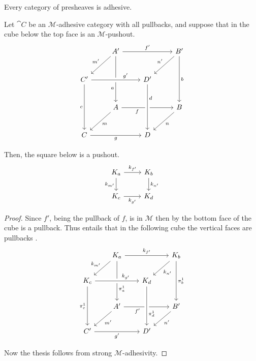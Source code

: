 \begin{cor}\label{cor:presh_adhesive}
    Every category of presheaves is adhesive.
\end{cor}

\color{blue}


\begin{lemma}\label{lemma:pushouts_kernel_pairs}
	Let $\cat C$ be an  $\mathcal{M}$-adhesive category with all pullbacks, and suppose that in the cube below the top face is an $\mathcal{M}$-pushout.
	\[\begin{tikzcd}[row sep=25, column sep=25]
		& {A'} && {B'} \\
		{C'} && {D'} \\
		& A && B \\
		C && D
		\arrow["{f'}", from=1-2, to=1-4]
		\arrow["{m'}"', from=1-2, to=2-1]
		\arrow["a"'{pos=0.7}, from=1-2, to=3-2]
		\arrow["{n'}"', from=1-4, to=2-3]
		\arrow["b", from=1-4, to=3-4]
		\arrow["{g'}"{pos=0.7}, from=2-1, to=2-3, crossing over]
		\arrow["c"', from=2-1, to=4-1]
		\arrow["f"'{pos=0.3}, from=3-2, to=3-4]
		\arrow["d"{pos=0.3}, from=2-3, to=4-3, crossing over]
		\arrow["m", from=3-2, to=4-1]
		\arrow["n", from=3-4, to=4-3]
		\arrow["g"', from=4-1, to=4-3]
	\end{tikzcd}\]
	
	Then, the square below is a pushout.
	\[
	\begin{tikzcd}%
		{K_a} \ar[r, "{k_{f'}}"] \ar[d, "{k_{m'}}"'] & {K_b} \ar[d, "{k_{n'}}"] \\
		{K_c} \ar[r, "{k_{g'}}"'] & {K_d}
	\end{tikzcd}
	\]
\end{lemma}

\begin{proof}
	Since $f'$, being the pullback of $f$, is in $\mathcal{M}$ then by   the bottom face of the cube is a pullback. Thus  entails that in the following cube the vertical faces are pullbacks .
	\[\begin{tikzcd}[row sep = 20, column sep = 20]
		& {K_a} && {K_b} \\
		{K_c} && {K_d} \\
		& {A'} && {B'} \\
		{C'} && {D'}
		\arrow["{k_{f'}}", from=1-2, to=1-4]
		\arrow["{k_{m'}}"', from=1-2, to=2-1]
		\arrow["{\pi_a^1}"{pos=0.7}, from=1-2, to=3-2]
		\arrow["{k_{n'}}", from=1-4, to=2-3]
		\arrow["{\pi_b^1}", from=1-4, to=3-4]
		\arrow["{k_{g'}}"{pos=0.7}, from=2-1, to=2-3, crossing over]
		\arrow["{\pi_c^1}"', from=2-1, to=4-1]
		\arrow["{f'}"'{pos=0.3}, from=3-2, to=3-4]
		\arrow["{\pi_d^1}"{pos=0.7}, from=2-3, to=4-3, crossing over]
		\arrow["{m'}", from=3-2, to=4-1]
		\arrow["{n'}", from=3-4, to=4-3]
		\arrow["{g'}"', from=4-1, to=4-3]
	\end{tikzcd}\]
	
Now the thesis follows from strong $\mathcal{M}$-adhesivity.
\end{proof}


